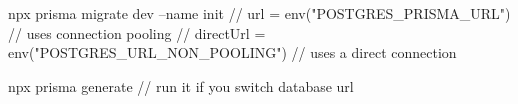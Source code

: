 npx prisma migrate dev --name init
// url       = env("POSTGRES_PRISMA_URL") // uses connection pooling
// directUrl = env("POSTGRES_URL_NON_POOLING") // uses a direct connection

npx prisma generate // run it if you switch database url